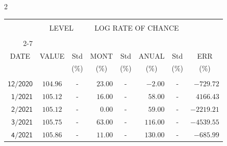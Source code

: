 \begin{multicols}{2}{ 
\begin{tabular}{rccrcrcr} 
\hline 
 \multicolumn{1}{|c|}{}  &  \multicolumn{2}{c|}{} & 
\multicolumn{4}{c}{} & \multicolumn{1}{|c|}{}\vspace{-.10in}\\ 
\multicolumn{1}{|c|}{}  &  \multicolumn{2}{c|}{LEVEL} & 
\multicolumn{4}{c}{LOG RATE OF CHANCE} & \multicolumn{1}{|c|}{}    \\  
\multicolumn{1}{|c|}{}  &  \multicolumn{2}{c|}{} & 
\multicolumn{4}{c}{} & \multicolumn{1}{|c|}{}\vspace{-.10in}\\ \cline{2-7} 
\multicolumn{1}{|c|}{ } &\multicolumn{1}{c|}{ } & \multicolumn{1}{c|}{} & \multicolumn{1}{c|}{} & \multicolumn{1}{c|}{}     & \multicolumn{1}{c|}{} & \multicolumn{1}{c|}{}  & \multicolumn{1}{c|}{}  \vspace{-.05in}\\  
\multicolumn{1}{|c|}{DATE } &\multicolumn{1}{c|}{ VALUE} & \multicolumn{1}{c|}{Std} & \multicolumn{1}{c|}{MONT} & \multicolumn{1}{c|}{Std}     & \multicolumn{1}{c|}{ANUAL} & \multicolumn{1}{c|}{Std}  & \multicolumn{1}{c|}{ERR}\\  
\multicolumn{1}{|c|}{ }      & \multicolumn{1}{c|}{  }    & \multicolumn{1}{c|}{($\%$)}&  \multicolumn{1}{c|}{($\%$)  }  & \multicolumn{1}{c|}{($\%$)} & \multicolumn{1}{c|}{($\%$) }     & \multicolumn{1}{c|}{ ($\%$) }  &  \multicolumn{1}{c|}{ ($\%$) } \\  
 \hline 
 \\$\mathsf{      12/2020}$ &$\mathsf{   104.96}$ &     - &$\mathsf{   23.00}$ &     - &$\mathsf{    -2.00 }$ &     - &$\mathsf{-729.72} $ \vspace{-.005in}\\ 
$\mathsf{       1/2021}$ &$\mathsf{   105.12}$ &     - &$\mathsf{   16.00}$ &     - &$\mathsf{    58.00 }$ &     - &$\mathsf{4166.43} $ \vspace{-.005in}\\ 
$\mathsf{       2/2021}$ &$\mathsf{   105.12}$ &     - &$\mathsf{    0.00}$ &     - &$\mathsf{    59.00 }$ &     - &$\mathsf{-2219.21} $ \vspace{-.005in}\\ 
$\mathsf{       3/2021}$ &$\mathsf{   105.75}$ &     - &$\mathsf{   63.00}$ &     - &$\mathsf{   116.00 }$ &     - &$\mathsf{-4539.55} $ \vspace{-.005in}\\ 
$\mathsf{       4/2021}$ &$\mathsf{   105.86}$ &     - &$\mathsf{   11.00}$ &     - &$\mathsf{   130.00 }$ &     - &$\mathsf{-685.99} $ \vspace{-.005in}\\ 

\end{tabular}}
\end{multicols}
